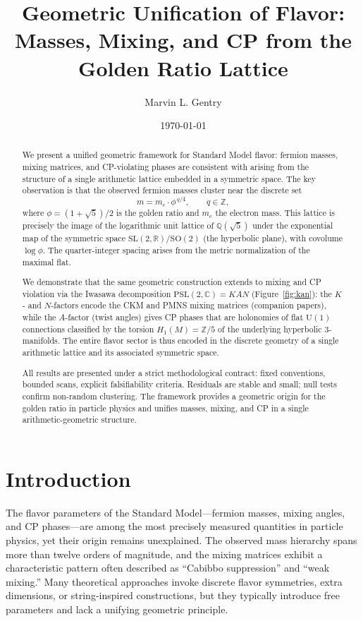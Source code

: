 ﻿\documentclass[12pt]{article}
\title{Geometric Unification of Flavor:\\ Masses, Mixing, and CP from the Golden Ratio Lattice}
\author[1]{Marvin L. Gentry}
\affil[1]{Independent Researcher, \texttt{drmlgentry@protonmail.com} \\ ORCID: 0009-0006-4550-2663}
\date{\today}
\theoremstyle{definition}
\begin{document}
\maketitle

\begin{abstract}
We present a unified geometric framework for Standard Model flavor: fermion masses, mixing matrices, and CP-violating phases are consistent with arising from the structure of a single arithmetic lattice embedded in a symmetric space. The key observation is that the observed fermion masses cluster near the discrete set
\[
m = m_e \cdot \phi^{\,q/4}, \qquad q\in\mathbb{Z},
\]
where $\phi = (1+\sqrt5)/2$ is the golden ratio and $m_e$ the electron mass. This lattice is precisely the image of the logarithmic unit lattice of $\mathbb{Q}(\sqrt5)$ under the exponential map of the symmetric space $\mathrm{SL}(2,\mathbb{R})/\mathrm{SO}(2)$ (the hyperbolic plane), with covolume $\log\phi$. The quarter-integer spacing arises from the metric normalization of the maximal flat.

We demonstrate that the same geometric construction extends to mixing and CP violation via the Iwasawa decomposition $\mathrm{PSL}(2,\mathbb{C}) = KAN$ (Figure~\ref{fig:kan}): the $K$- and $N$-factors encode the CKM and PMNS mixing matrices (companion papers), while the $A$-factor (twist angles) gives CP phases that are holonomies of flat $\mathrm{U}(1)$ connections classified by the torsion $H_1(M)=\mathbb{Z}/5$ of the underlying hyperbolic 3-manifolds. The entire flavor sector is thus encoded in the discrete geometry of a single arithmetic lattice and its associated symmetric space.

All results are presented under a strict methodological contract: fixed conventions, bounded scans, explicit falsifiability criteria. Residuals are stable and small; null tests confirm non-random clustering. The framework provides a geometric origin for the golden ratio in particle physics and unifies masses, mixing, and CP in a single arithmetic-geometric structure.
\end{abstract}

\section{Introduction}
\label{sec:intro}

The flavor parameters of the Standard Model---fermion masses, mixing angles, and CP phases---are among the most precisely measured quantities in particle physics, yet their origin remains unexplained. The observed mass hierarchy spans more than twelve orders of magnitude, and the mixing matrices exhibit a characteristic pattern often described as ``Cabibbo suppression'' and ``weak mixing.'' Many theoretical approaches invoke discrete flavor symmetries, extra dimensions, or string-inspired constructions, but they typically introduce free parameters and lack a unifying geometric principle.
\end{document}
